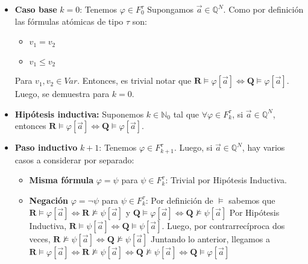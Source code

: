 \documentclass{article}
\begin{document}
\begin{itemize}
  \item \textbf{Caso base} $k=0$: Tenemos $\varphi\in F^\tau_0$
        \newline
        Supongamos $\vec{a}\in\mathbb{Q}^N$. Como por definición las fórmulas atómicas de tipo $\tau$ son:
        \begin{itemize}
          \item $v_1=v_2$
          \item $v_1\leq v_2$
        \end{itemize}
        Para $v_1,v_2\in Var$. Entonces, es trivial notar que $\mathbf{R}\vDash\varphi[\vec{a}]\iff\mathbf{Q}\vDash\varphi[\vec{a}]$.
        \newline
        Luego, se demuestra para $k=0$.
  \item \textbf{Hipótesis inductiva:} Suponemos $k\in\mathbb{N}_0$ tal que $\forall\varphi\in F^\tau_k$, si $\vec{a}\in\mathbb{Q}^N$, entonces $\mathbf{R}\vDash\varphi[\vec{a}]\iff\mathbf{Q}\vDash\varphi[\vec{a}]$.
  \item \textbf{Paso inductivo} $k+1$: Tenemos $\varphi\in F^\tau_{k+1}$. Luego, si $\vec{a}\in\mathbb{Q}^N$, hay varios casos a considerar por separado:
        \begin{itemize}
          \item \textbf{Misma fórmula} $\varphi=\psi$ para $\psi\in F^\tau_k$: \newline
                \hspace*{0.5cm} Trivial por Hipótesis Inductiva.
          \item \textbf{Negación} $\varphi=\neg\psi$ para $\psi\in F^\tau_k$: \newline
                \hspace*{0.5cm} Por definición de $\vDash$ sabemos que $\mathbf{R}\vDash\varphi[\vec{a}]\iff\mathbf{R}\not\vDash\psi[\vec{a}]$ y $\mathbf{Q}\vDash\varphi[\vec{a}]\iff\mathbf{Q}\not\vDash\psi[\vec{a}]$ \newline
                \hspace*{0.5cm} Por Hipótesis Inductiva, $\mathbf{R}\vDash\psi[\vec{a}]\iff\mathbf{Q}\vDash\psi[\vec{a}]$. Luego, por contrarrecíproca dos veces, $\mathbf{R}\not\vDash\psi[\vec{a}]\iff\mathbf{Q}\not\vDash\psi[\vec{a}]$ \newline
                \hspace*{0.5cm} Juntando lo anterior, llegamos a $\mathbf{R}\vDash\varphi[\vec{a}]\iff\mathbf{R}\not\vDash\psi[\vec{a}]\iff\mathbf{Q}\not\vDash\psi[\vec{a}]\iff\mathbf{Q}\vDash\varphi[\vec{a}]$ \newline

\end{itemize}
\end{itemize}
\end{document}
